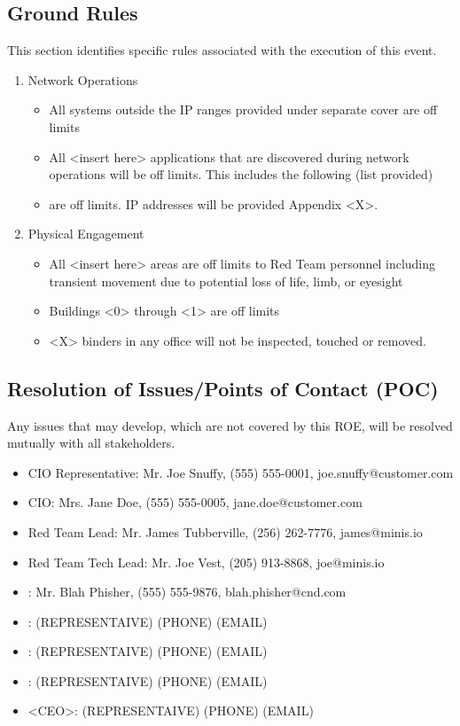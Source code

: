 \documentclass[12pt,letterpaper]{article}
\begin{document}
\subsection{Ground Rules}
This section identifies specific rules associated with the execution of this event.
\begin{enumerate}[label=\alph*.]
    \item Network Operations
    \begin{itemize}
        \item All systems outside the IP ranges provided under separate cover are off limits
        \item All <insert here> applications that are discovered during network operations will be off limits. This includes the following (list provided)
        \item <insert here> are off limits. IP addresses will be provided Appendix <X>.
    \end{itemize}
    
    \item Physical Engagement
    \begin{itemize}
        \item All <insert here> areas are off limits to Red Team personnel including transient movement due to potential loss of life, limb, or eyesight
        \item Buildings <0> through <1> are off limits
        \item <X> binders in any office will not be inspected, touched or removed.
    \end{itemize}
\end{enumerate}

\subsection{Resolution of Issues/Points of Contact (POC)}
Any issues that may develop, which are not covered by this ROE, will be resolved mutually with all stakeholders.
\begin{itemize}
    \item CIO Representative: Mr. Joe Snuffy, (555) 555-0001, joe.snuffy@customer.com
    \item CIO: Mrs. Jane Doe, (555) 555-0005, jane.doe@customer.com
    \item Red Team Lead: Mr. James Tubberville, (256) 262-7776, james@minis.io
    \item Red Team Tech Lead: Mr. Joe Vest, (205) 913-8868, joe@minis.io
    \item <Trusted Agent>: Mr. Blah Phisher, (555) 555-9876, blah.phisher@cnd.com
    \item <System Owner>: (REPRESENTAIVE) (PHONE) (EMAIL)
    \item <Engagement Director>: (REPRESENTAIVE) (PHONE) (EMAIL)
    \item <White Cell Lead>: (REPRESENTAIVE) (PHONE) (EMAIL)
    \item <CEO>: (REPRESENTAIVE) (PHONE) (EMAIL)
\end{itemize}
\end{document}
